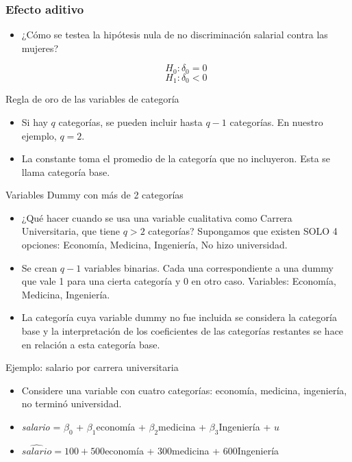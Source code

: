 \documentclass{beamer}
\begin{document}
\begin{frame}
\frametitle{Efecto aditivo}

\begin{itemize}
    \item ¿Cómo se testea la hipótesis nula de no discriminación salarial contra las mujeres?
    
        \[H_0: \delta_0 = 0\] 
        \[H_1: \delta_0 < 0\]
    
\end{itemize}

\end{frame}

\begin{frame}{Regla de oro de las variables de categoría}
\begin{itemize}
    
    \item Si hay $q$ categorías, se pueden incluir hasta $q - 1$ categorías. En nuestro ejemplo, $q = 2$.
    \item La constante toma el promedio de la categoría que no incluyeron. Esta se llama categoría base. 
\end{itemize}
\end{frame}
\begin{frame}{Variables Dummy con más de 2 categorías}
\begin{itemize}
    \item ¿Qué hacer cuando se usa una variable cualitativa como Carrera Universitaria, que tiene \(q > 2\) categorías? 
    Supongamos que existen SOLO 4 opciones: Economía, Medicina, Ingeniería, No hizo universidad.
    \item Se crean \(q - 1\) variables binarias. Cada una correspondiente a una dummy que vale 1 para una cierta categoría y 0 en otro caso. Variables: Economía, Medicina, Ingeniería.
    \item La categoría cuya variable dummy no fue incluida se considera la categoría base y la interpretación de los coeficientes de las categorías restantes se hace en relación a esta categoría base.
\end{itemize}
\end{frame}
\begin{frame}[shrink=10, t]{Ejemplo: salario por carrera universitaria}
    \begin{itemize}
        \item Considere una variable con cuatro categorías: economía, medicina, ingeniería, no terminó universidad.
        \item \textit{salario} = \(\beta_0\) + \(\beta_1\)economía + \(\beta_2\)medicina + \(\beta_3\)Ingeniería + \(u\)
        \item \(\hat{salario} = 100 + 500\)economía + 300medicina + 600Ingeniería
    \end{itemize}
\end{frame}
\end{document}
